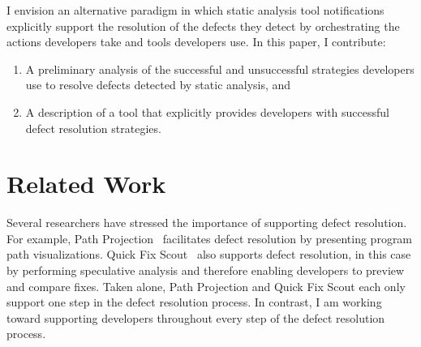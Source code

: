 \documentclass{sig-alternate}
\newcommand{\compresslist}{
	\vspace{-.5em}
	\setlength{\itemsep}{1pt}
	\setlength{\parskip}{0pt}
	\setlength{\parsep}{0pt}
}
\begin{document}
I envision an alternative paradigm in which static analysis tool notifications explicitly support the resolution of the defects they detect by orchestrating the actions developers take and tools developers use.
In this paper, I contribute: 

\begin{enumerate}
	\compresslist
	\item A preliminary analysis of the successful and unsuccessful strategies developers use to resolve defects detected by static analysis, and
	\item A description of a tool that explicitly provides developers with successful defect resolution strategies.
	
\end{enumerate}



\section{Related Work}
\label{sec:rw}
Several researchers have stressed the importance of supporting defect resolution.
For example, Path Projection~\cite{Khoo2008} facilitates defect resolution by presenting program path visualizations. 
Quick Fix Scout~\cite{Muslu2012} also supports defect resolution, in this case by performing speculative analysis and therefore enabling developers to preview and compare fixes.
Taken alone, Path Projection and Quick Fix Scout each only support one step in the defect resolution process.
In contrast, I am working toward supporting developers throughout every step of the defect resolution process.
\end{document}
